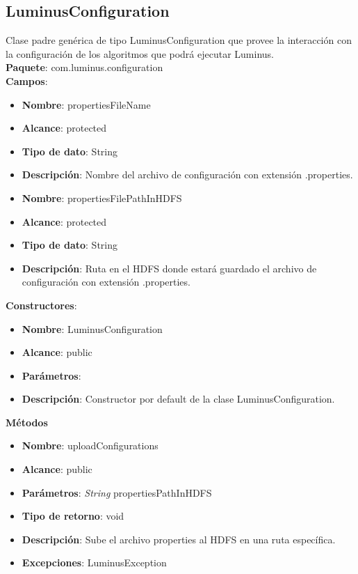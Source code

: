 \subsection{LuminusConfiguration}
Clase padre genérica de tipo LuminusConfiguration que provee la interacción con la configuración de los algoritmos que podrá ejecutar Luminus.\\
\textbf{Paquete}: com.luminus.configuration\\
\textbf{Campos}:
\begin{UClist}
	\begin{itemize}
		\item \textbf{Nombre}: propertiesFileName
		\item \textbf{Alcance}: protected
		\item \textbf{Tipo de dato}: String
		\item \textbf{Descripción}: Nombre del archivo de configuración con extensión .properties.\\
	\end{itemize}
	\begin{itemize}
		\item \textbf{Nombre}: propertiesFilePathInHDFS
		\item \textbf{Alcance}: protected
		\item \textbf{Tipo de dato}: String
		\item \textbf{Descripción}: Ruta en el HDFS donde estará guardado el archivo de configuración con extensión .properties.\\
	\end{itemize}
\end{UClist}
\textbf{Constructores}:
\begin{UClist}
	\begin{itemize}
		\item \textbf{Nombre}: LuminusConfiguration
		\item \textbf{Alcance}: public
		\item \textbf{Parámetros}: 
		\item \textbf{Descripción}: Constructor por default de la clase LuminusConfiguration.
	\end{itemize}
\end{UClist}
\textbf{Métodos}
\begin{UClist}
	\begin{itemize}
		\item \textbf{Nombre}: uploadConfigurations
		\item \textbf{Alcance}: public
		\item \textbf{Parámetros}: \emph{String} propertiesPathInHDFS
		\item \textbf{Tipo de retorno}: void
		\item \textbf{Descripción}: Sube el archivo properties al HDFS en una ruta específica.
		\item \textbf{Excepciones}: LuminusException\\
	\end{itemize}
\end{UClist}
